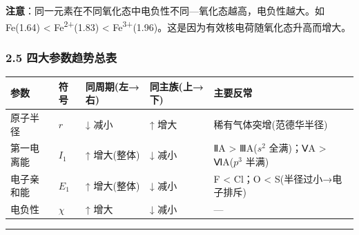 \textbf{注意}：同一元素在不同氧化态中电负性不同---氧化态越高，电负性越大。如 Fe(1.64) \textless{} Fe\textsuperscript{2+}(1.83) \textless{} Fe\textsuperscript{3+}(1.96)。这是因为有效核电荷随氧化态升高而增大。

\subsubsection{2.5 四大参数趋势总表}\label{ux56dbux5927ux53c2ux6570ux8d8bux52bfux603bux8868}

{\def\LTcaptype{none} %
\begin{longtable}[]{@{}
  >{\raggedright\arraybackslash}p{}
  >{\centering\arraybackslash}p{}
  >{\centering\arraybackslash}p{}
  >{\centering\arraybackslash}p{}
  >{\raggedright\arraybackslash}p{}@{}}
\toprule\noalign{}
\begin{minipage}[b]{\linewidth}\raggedright
参数
\end{minipage} & \begin{minipage}[b]{\linewidth}\centering
符号
\end{minipage} & \begin{minipage}[b]{\linewidth}\centering
同周期(左→右)
\end{minipage} & \begin{minipage}[b]{\linewidth}\centering
同主族(上→下)
\end{minipage} & \begin{minipage}[b]{\linewidth}\raggedright
主要反常
\end{minipage} \\
\midrule\noalign{}
\endhead
\bottomrule\noalign{}
\endlastfoot
原子半径 & \(r\) & ↓ 减小 & ↑ 增大 & 稀有气体突增(范德华半径) \\
第一电离能 & \(I_1\) & ↑ 增大(整体) & ↓ 减小 & ⅡA \textgreater{} ⅢA(\(s^2\) 全满)；ⅤA \textgreater{} ⅥA(\(p^3\) 半满) \\
电子亲和能 & \(E_1\) & ↑ 增大(整体) & ↓ 减小 & F \textless{} Cl；O \textless{} S(半径过小→电子排斥) \\
电负性 & \(\chi\) & ↑ 增大 & ↓ 减小 & --- \\
\end{longtable}
}

\begin{center}\rule{0.5\linewidth}{0.5pt}\end{center}

